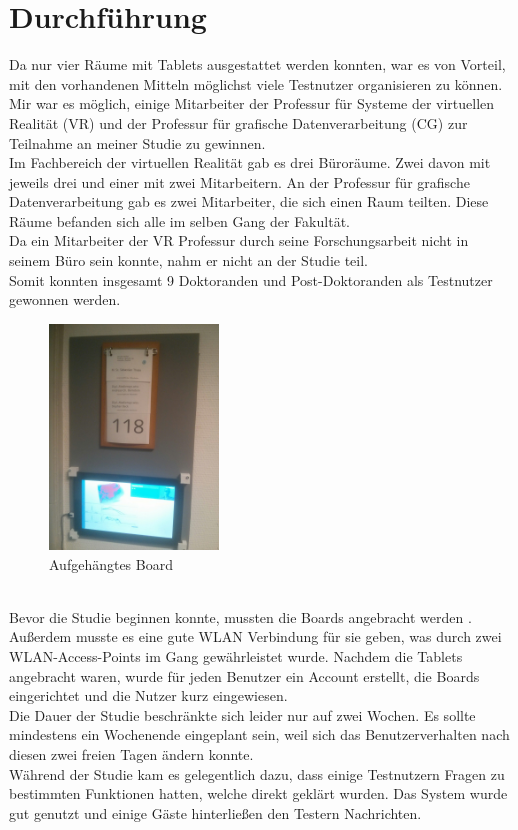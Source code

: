 \section{Durchführung}\label{Durchführung}
Da nur vier Räume mit Tablets ausgestattet werden konnten, war es von Vorteil, mit den vorhandenen Mitteln möglichst viele Testnutzer organisieren zu können.
Mir war es möglich, einige Mitarbeiter der Professur für Systeme der virtuellen Realität (VR) und der Professur für grafische Datenverarbeitung (CG) zur Teilnahme an meiner Studie zu gewinnen.
\\
Im Fachbereich der virtuellen Realität gab es drei Büroräume.
Zwei davon mit jeweils drei und einer mit zwei Mitarbeitern.
An der Professur für grafische Datenverarbeitung gab es zwei Mitarbeiter, die sich einen Raum teilten.
Diese Räume befanden sich alle im selben Gang der Fakultät.
\\
Da ein Mitarbeiter der VR Professur durch seine Forschungsarbeit nicht in seinem Büro sein konnte, nahm er nicht an der Studie teil.
\\
Somit konnten insgesamt 9 Doktoranden und Post-Doktoranden als Testnutzer gewonnen werden.
\begin{figure}[h!]
  \centering
  \includegraphics[width=0.4\textwidth]{./img/StudieAufgehaengtesBoard.jpg}
  \caption{Aufgehängtes Board}
  \label{img:StudieAufgehaengesBoard}
\end{figure}
\\
Bevor die Studie beginnen konnte, mussten die Boards angebracht werden .
Außerdem musste es eine gute WLAN Verbindung für sie geben, was durch zwei WLAN-Access-Points im Gang gewährleistet wurde.
Nachdem die Tablets angebracht waren, wurde für jeden Benutzer ein Account erstellt, die Boards eingerichtet und die Nutzer kurz eingewiesen.
\\
Die Dauer der Studie beschränkte sich leider nur auf zwei Wochen.
Es sollte mindestens ein Wochenende eingeplant sein, weil sich das Benutzerverhalten nach diesen zwei freien Tagen ändern konnte.
\\
Während der Studie kam es gelegentlich dazu, dass einige Testnutzern Fragen zu bestimmten Funktionen hatten, welche direkt geklärt wurden.
Das System wurde gut genutzt und einige Gäste hinterließen den Testern Nachrichten.



